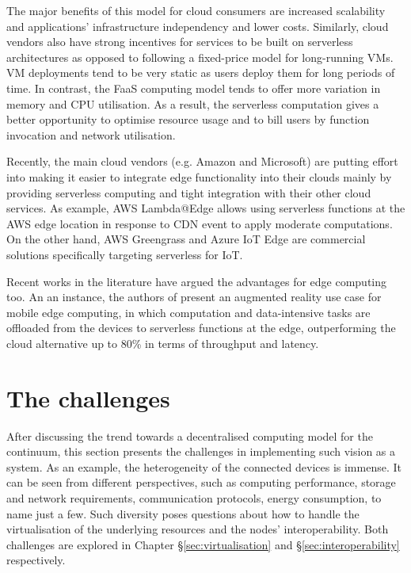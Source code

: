 The major benefits of this model for cloud consumers are increased scalability and applications' infrastructure independency and lower costs. Similarly, cloud vendors also have strong incentives for services to be built on serverless architectures as opposed to following a fixed-price model for long-running VMs. VM deployments tend to be very static as users deploy them for long periods of time. In contrast, the FaaS computing model tends to offer more variation in memory and CPU utilisation. As a result, the serverless computation gives a better opportunity to optimise resource usage and to bill users by function invocation and network utilisation.

Recently, the main cloud vendors (e.g. Amazon and Microsoft) are putting effort into making it easier to integrate edge functionality into their clouds mainly by providing serverless computing and tight integration with their other cloud services. As example, AWS Lambda@Edge \cite{aws-lambda-edge} allows using serverless functions at the AWS edge location in response to CDN event to apply moderate computations. On the other hand, AWS Greengrass \cite{aws-greengrass} and Azure IoT Edge \cite{azure-iot-edge} are commercial solutions specifically targeting serverless for IoT.

Recent works in the literature have argued the advantages for edge computing too. An an instance, the authors of \cite{serverless-mec} present an augmented reality use case for mobile edge computing, in which computation and data-intensive tasks are offloaded from the devices to serverless functions at the edge, outperforming the cloud alternative up to 80\% in terms of throughput and latency.

\chapter{The challenges}
\label{challenges}

After discussing the trend towards a decentralised computing model for the continuum, this section presents the challenges in implementing such vision as a system. As an example, the heterogeneity of the connected devices is immense. It can be seen from different perspectives, such as computing performance, storage and network requirements, communication protocols, energy consumption, to name just a few. Such diversity poses questions about how to handle the virtualisation of the underlying resources and the nodes' interoperability. Both challenges are explored in Chapter §\ref{sec:virtualisation} and §\ref{sec:interoperability} respectively.

